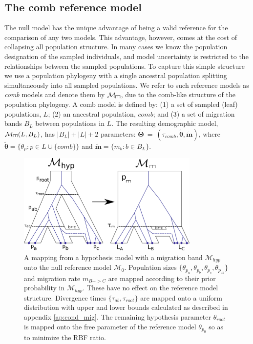 \documentclass[11pt]{article}
\newcommand{\vect}[1]{\boldsymbol{\mathbf{#1}}}
\newcommand{\M}{\mathcal{M}}
\newcommand{\T}{\vect{\Theta}}
\newcommand{\Tref}{\widetilde{\T}}
\newcommand{\1}{\mathbbm{1}}
\def\comb{\rotatebox[origin=c]{90}{$\exists$}}
\newcommand{\Mcomb}{\M_{\comb}}
\newcommand{\thetas}{\vect\theta}
\newcommand{\migs}{\vect{m}}
\newcommand{\tacomb}{\tau_{comb}}
\def\comb{\rotatebox[origin=c]{90}{$\exists$}}
\begin{document}
\subsection{The comb reference model} \label{The comb reference model} 


The null model has the unique advantage of being a valid reference for the comparison of any two models.
This advantage, however, comes at the cost of collapsing all population structure.
%
In many cases we know the population designation of the sampled individuals, and model uncertainty is restricted to the relationships between the sampled populations.
%
To capture this simple structure we use a population phylogeny with a single ancestral population splitting simultaneously into all sampled populations.
We refer to such reference models as {\em comb} models and denote them by $\Mcomb$,  due to the comb-like structure of the population phylogeny.
%
A comb model is defined by: (1) a set of sampled (leaf) populations, $L$; (2) an ancestral population, $comb$; and (3) a set of migration bands $B_L$ between populations in $L$.
%
The resulting demographic model, $\Mcomb(L,B_L)$, has $|B_L|+|L|+2$ parameters: $\Tref ~=~ (\tacomb, \widetilde{\thetas},\widetilde{\migs})$,
where $\widetilde{\thetas}=\{\theta_p:p\in L\cup \{comb\}\}$ and $\widetilde{\migs} = \{m_b:b\in B_L\}$.
%

\begin{figure}[h]
\centering
\includegraphics[width=0.8\textwidth]
{comb_model_with_migration_single_genealogy}
\captionsetup{width=.8\textwidth}
\caption{A mapping from a hypothesis model with a migration band $\M_{hyp}$ onto the null reference model $\M_0$. Population sizes $\{\theta_{p_a}, \theta_{p_b}, \theta_{p_c}, \theta_{p_{ab}}\}$ and migration rate $m_{B->C}$ are mapped according to their prior probability in $\M_{hyp}$. These have no effect on the reference model structure. Divergence times $\{\tau_{ab}, \tau_{root}\}$ are mapped onto a uniform distribution with upper and lower bounds calculated as described in appendix \ref{ap:cond_mig}. The remaining hypothesis parameter $\theta_{root}$ is mapped onto the free parameter of the reference model $\theta_{p_0}$ so as to minimize the RBF ratio.
}
\label{fig:comb_model_with_migration_single_genealogy}
\end{figure}
\end{document}
